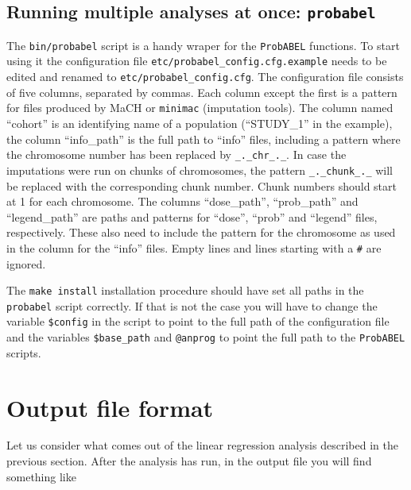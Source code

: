 \documentclass[12pt,a4paper]{article}
\newcommand{\PA}{\texttt{ProbABEL}}
\begin{document}

\subsection{Running multiple analyses at once: \texttt{probabel}}
The \texttt{bin/probabel} script is a handy wraper for the \PA{}
functions. To start using it the configuration file
\texttt{etc/probabel\_config.cfg.example} needs to be edited and
renamed to \texttt{etc/probabel\_config.cfg}. The configuration file
consists of five columns, separated by commas. Each column except the
first is a pattern for files produced by MaCH or \texttt{minimac}
(imputation tools). The column named ``cohort'' is an identifying name
of a population (``STUDY\_1'' in the example), the column
``info\_path'' is the full path to ``info'' files, including a pattern
where the chromosome number has been replaced by
\texttt{\_.\_chr\_.\_}. In case the imputations were run on chunks of
chromosomes, the pattern \texttt{\_.\_chunk\_.\_} will be replaced
with the corresponding chunk number. Chunk numbers should start at 1
for each chromosome. The columns ``dose\_path'', ``prob\_path'' and
``legend\_path'' are paths and patterns for ``dose'', ``prob'' and
``legend'' files, respectively. These also need to include the pattern
for the chromosome as used in the column for the ``info'' files.
Empty lines and lines starting with a \texttt{\#} are ignored.

The \texttt{make install} installation procedure should have set all
paths in the \texttt{probabel} script correctly. If that is not the
case you will have to change the variable \texttt{\$config} in the
script to point to the full path of the configuration file and the
variables \texttt{\$base\_path} and \texttt{@anprog} to point the full
path to the \PA{} scripts.


\section{Output file format}
Let us consider what comes out of the linear regression analysis
described in the previous section. After the analysis has run, in
the output file you will find something like
\begin{small}

\end{small}
\end{document}
